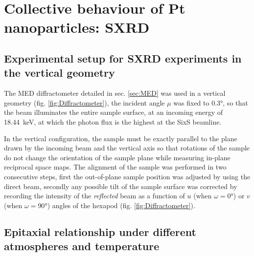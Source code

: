 \section{Collective behaviour of Pt nanoparticles: SXRD}


\subsection{Experimental setup for SXRD experiments in the vertical geometry}\label{sec:SXRDSetupV}

The MED diffractometer detailed in sec. \ref{sec:MED} was used in a vertical geometry (fig. \ref{fig:Diffractometer}), the incident angle $\mu$ was fixed to \ang{0.3}, so that the beam illuminates the entire sample surface, at an incoming energy of \qty{18.44}{\keV}, at which the photon flux is the highest at the SixS beamline.

In the vertical configuration, the sample must be exactly parallel to the plane drawn by the incoming beam and the vertical axis so that rotations of the sample do not change the orientation of the sample plane while measuring in-plane reciprocal space maps.
The alignment of the sample was performed in two consecutive steps, first the out-of-plane sample position was adjusted by using the direct beam, secondly any possible tilt of the sample surface was corrected by recording the intensity of the \textit{reflected} beam as a function of $u$ (when $\omega=\ang{0}$) or $v$ (when $\omega=\ang{90}$) angles of the hexapod (fig. \ref{fig:Diffractometer}).

\subsection{Epitaxial relationship under different atmospheres and temperature}

